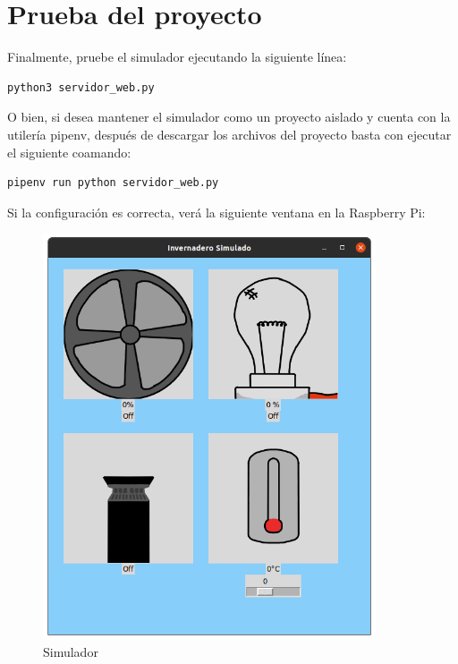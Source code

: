 \documentclass[letterpaper,10.5pt]{article} %
\begin{document}
	\section{Prueba del proyecto}
		Finalmente, pruebe el simulador ejecutando la siguiente línea:
		\begin{verbatim}python3 servidor_web.py\end{verbatim}
	
		O bien, si desea mantener el simulador como un proyecto aislado y cuenta con la utilería pipenv, después de descargar los archivos del proyecto basta con ejecutar el siguiente coamando:
		\begin{verbatim}pipenv run python servidor_web.py\end{verbatim}
	
	\hfill \break %

	Si la configuración es correcta, verá la siguiente ventana en la Raspberry Pi:
	\begin{figure}[H]
		\centering
		\includegraphics[width=\linewidth, height=12cm, keepaspectratio]{img/simulador.png}
		\caption{Simulador} %
		\label{fig:figura2} %
	\end{figure}
\end{document}
